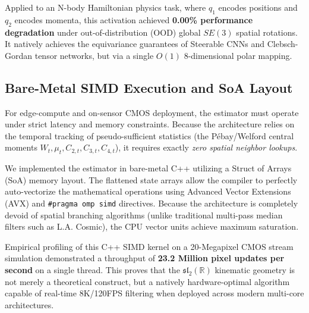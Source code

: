 Applied to an N-body Hamiltonian physics task, where $q_1$ encodes positions and $q_2$ encodes momenta, this activation achieved \textbf{0.00\% performance degradation} under out-of-distribution (OOD) global $SE(3)$ spatial rotations. It natively achieves the equivariance guarantees of Steerable CNNs and Clebsch-Gordan tensor networks, but via a single $O(1)$ $8$-dimensional polar mapping.

\subsection{Bare-Metal SIMD Execution and SoA Layout}
For edge-compute and on-sensor CMOS deployment, the estimator must operate under strict latency and memory constraints. Because the architecture relies on the temporal tracking of pseudo-sufficient statistics (the Pébay/Welford central moments $W_t, \mu_t, C_{2,t}, C_{3,t}, C_{4,t}$), it requires exactly \textit{zero spatial neighbor lookups}.

We implemented the estimator in bare-metal C++ utilizing a Struct of Arrays (SoA) memory layout. The flattened state arrays allow the compiler to perfectly auto-vectorize the mathematical operations using Advanced Vector Extensions (AVX) and \texttt{\#pragma omp simd} directives. Because the architecture is completely devoid of spatial branching algorithms (unlike traditional multi-pass median filters such as L.A. Cosmic), the CPU vector units achieve maximum saturation. 

Empirical profiling of this C++ SIMD kernel on a 20-Megapixel CMOS stream simulation demonstrated a throughput of \textbf{23.2 Million pixel updates per second} on a single thread. This proves that the $\mathfrak{sl}_2(\mathbb{R})$ kinematic geometry is not merely a theoretical construct, but a natively hardware-optimal algorithm capable of real-time 8K/120FPS filtering when deployed across modern multi-core architectures.
